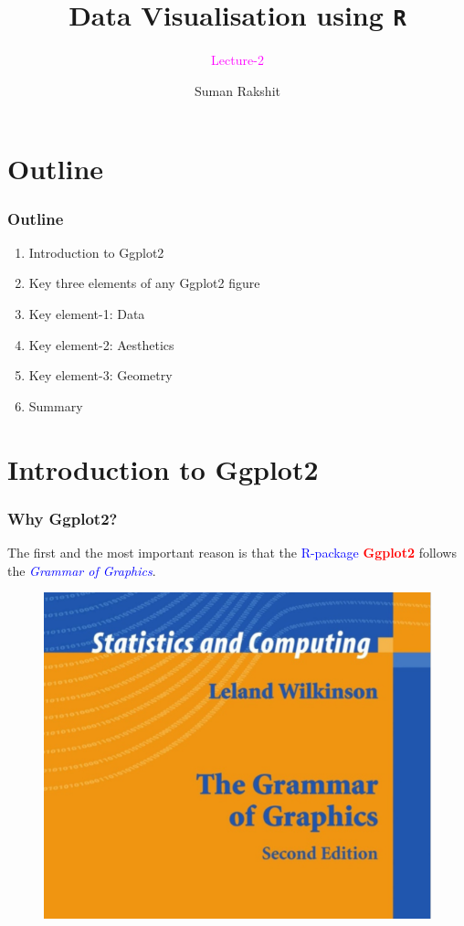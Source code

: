 \documentclass{beamer}
\title[]{Data Visualisation using \texttt{R}}
\subtitle{\textcolor{magenta}{Lecture-2}}
\author[]{Suman Rakshit} %
\institute[Scool of EECMS, Curtin University] %
{
	\textcolor{magenta}{Scool of EECMS, Curtin University} %
}
\begin{document}
\begin{frame}
	\titlepage %
\end{frame}







\section{Outline}
\begin{frame}[t]\frametitle{Outline}
\begin{enumerate}
\item Introduction to Ggplot2
\item Key three elements of any Ggplot2 figure
\item Key element-1: Data
\item Key element-2: Aesthetics
\item Key element-3: Geometry
\item Summary
\end{enumerate}
\end{frame}


\section{Introduction to Ggplot2}
\begin{frame}\frametitle{Why Ggplot2?}
The first and the most important reason is that the \textcolor{blue}{R-package} \textbf{\textcolor{red}{Ggplot2}} follows the \textit{\textcolor{blue}{Grammar of Graphics}}.
\begin{figure}
\includegraphics[width=0.70\linewidth]{PlotsLec2/GrammerOfGraphics}
\end{figure}
\end{frame}
\end{document}
